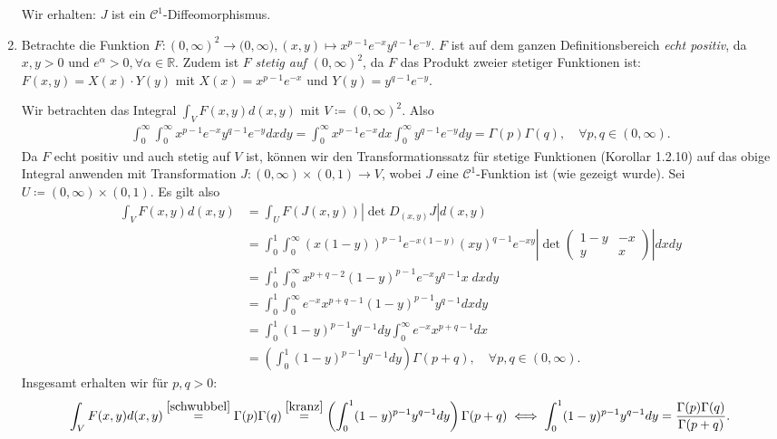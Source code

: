 \documentclass[a4paper,DIV=1]{article}
\theoremstyle{plain}
\begin{document}
\begin{enumerate}
	Wir erhalten: $J$ ist ein $\mathcal C^1$-Diffeomorphismus.
	
	\item Betrachte die Funktion $F: (0,\infty)^2 \to \mathbb (0,\infty), (x,y) \mapsto x^{p-1}e^{-x}y^{q-1}e^{-y}$. $F$ ist auf dem ganzen Definitionsbereich \emph{echt positiv}, da $x,y > 0$ und $e^{\alpha} > 0, \forall \alpha \in \mathbb R$. Zudem ist $F$ \emph{stetig auf $(0,\infty)^2$}, da $F$ das Produkt zweier stetiger Funktionen ist: $F(x,y) = X(x) \cdot Y(y)$ mit $X(x) = x^{p-1}e^{-x}$ und $Y(y) = y^{q-1}e^{-y}$. 
	
	Wir betrachten das Integral $\int_VF(x,y)d(x,y)$ mit $V \coloneqq (0,\infty)^2$. Also
	\begin{align}
		\label{schwubbel}
		\int_0^{\infty} \int_0^{\infty} x^{p-1}e^{-x}y^{q-1}e^{-y}dx dy = 	\int_0^{\infty} x^{p-1}e^{-x}dx \int_0^{\infty}y^{q-1}e^{-y} dy = \Gamma(p) \Gamma(q), \quad \forall p,q \in (0, \infty).
	\end{align}
	Da $F$ echt positiv und auch stetig auf $V$ ist, können wir den Transformationssatz für stetige Funktionen (Korollar 1.2.10) auf das obige Integral anwenden mit Transformation $J: (0,\infty) \times (0,1) \to V$, wobei $J$ eine $\mathcal C^1$-Funktion ist (wie gezeigt wurde). Sei $U \coloneqq (0,\infty) \times (0,1)$. Es gilt also
	\begin{align*}
		\int_VF(x,y)d(x,y) &= \int_{U}F(J(x,y)) |\det D_{(x,y)}J|d(x,y)\\
		&= \int_0^1 \int_0^{\infty} (x(1-y))^{p-1}e^{-x(1-y)}(xy)^{q-1}e^{-xy} | \det \begin{pmatrix}
			1-y & -x \\ y & x
		\end{pmatrix}|dx dy \\
		&=  \int_0^1 \int_0^{\infty} x^{p+q-2}(1-y)^{p-1}e^{-x}y^{q-1} x \; dxdy \\
		&= \int_0^1 \int_0^{\infty} e^{-x}x^{p+q-1}(1-y)^{p-1}y^{q-1} dxdy \\
		&= \int_0^1 (1-y)^{p-1}y^{q-1} dy \int_0^{\infty}e^{-x}x^{p+q-1} dx \\
		&= \left(\int_0^1 (1-y)^{p-1}y^{q-1} dy\right) \Gamma(p+q), \quad \forall p,q \in (0, \infty). \tag{2} \label{kranz}
	\end{align*}
	Insgesamt erhalten wir für $p,q > 0$:
	\[
			\int_VF(x,y)d(x,y) \overset{\eqref{schwubbel}}{=} \Gamma(p) \Gamma(q) \overset{\eqref{kranz}}{=} \left(\int_0^1 (1-y)^{p-1}y^{q-1} dy\right) \Gamma(p+q) \iff \int_0^1 (1-y)^{p-1}y^{q-1} dy = \frac{\Gamma(p) \Gamma(q)}{\Gamma(p+q)}.
	\]
\end{enumerate}
	
\end{document}
